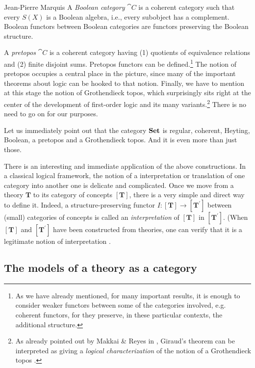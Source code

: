 \begin{artengenv}{Jean-Pierre Marquis}
A \textit{Boolean category} \( \cat{C} \) is a coherent category such that every \( S(X) \) is a Boolean algebra, i.e., every subobject has a complement. Boolean functors between Boolean categories are functors preserving the Boolean structure.

A \textit{pretopos} \( \cat{C} \) is a coherent category having (1) quotients of equivalence relations and (2) finite disjoint sums. Pretopos functors can be defined.\footnote{As we have already mentioned, for many important results, it is enough to consider weaker functors between some of the categories involved, e.g. coherent functors, for they preserve, in these particular contexts, the additional structure.}
The notion of pretopos occupies a central place in the picture, since many of the important theorems about logic can be hooked to that notion. Finally, we have to mention at this stage the notion of Grothendieck topos, which surprisingly sits right at the center of the development of first-order logic and its many variants.\footnote{As already pointed out by Makkai \& Reyes in \parencite*{MakkaiReyes1977}, Giraud's theorem can be interpreted as giving a \emph{logical characterization} of the notion of a Grothendieck topos \parencite[see][chapter~1, section~4]{MakkaiReyes1977}.} There is no need to go on for our purposes. 

Let us immediately point out that the category \( \mathbf{Set} \) is regular, coherent, Heyting, Boolean, a pretopos and a Grothendieck topos. And it is even more than just those.

There is an interesting and immediate application of the above constructions. In a classical logical framework, the notion of a interpretation or translation of one category into another one is delicate and complicated. Once we move from a theory \( \mathbf{T} \) to its category of concepts \( [\mathbf{T}] \), there is a very simple and direct way to define it. Indeed, a structure-preserving functor \( I\colon [\mathbf{T}] \rightarrow [\mathbf{T}^{\prime}] \) between (small) categories of concepts is called an \textit{interpretation} of \([ \mathbf{T}] \) in \( [\mathbf{T}^{\prime}] \). (When \( [\mathbf{T}] \) and \( [\mathbf{T}^{\prime}] \) have been constructed from theories, one can verify that it is a legitimate notion of interpretation \parencite[see][chap.~7, p.196]{MakkaiReyes1977}. 


\subsection{The models of a theory as a category}


\end{artengenv}
